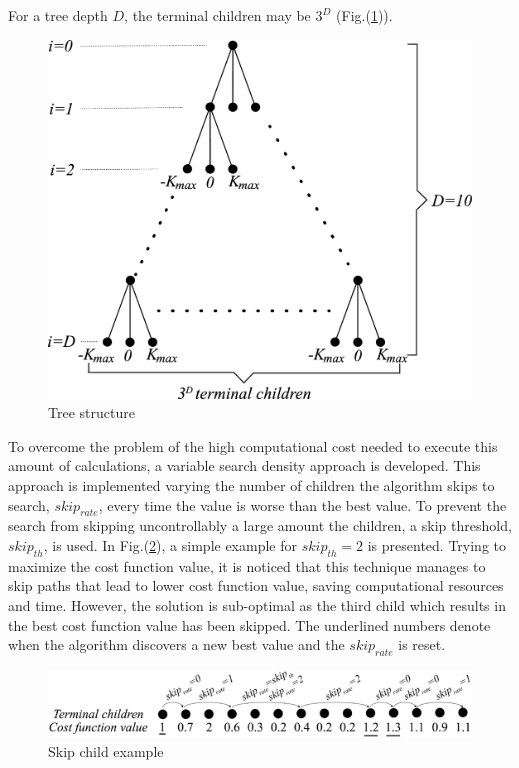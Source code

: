 \documentclass[journal]{new-aiaa}
\begin{document}
For a tree depth $D$, the terminal children may be $3^D$ (Fig.(\ref{fig:tree2})). 
\begin{figure}[H]
\centering
\includegraphics[width=5in]{tree2test.eps}
\caption{Tree structure}
\label{fig:tree2}
\end{figure}

To overcome the problem of the high computational cost needed to execute this amount of calculations, a variable search density approach is developed. This approach is implemented varying the number of children the algorithm skips to search, ${skip}_{rate}$, every time the value is worse than the best value. To prevent the search from skipping uncontrollably a large amount the children, a skip threshold, ${skip}_{th}$, is used. In Fig.(\ref{fig:skipexample}), a simple example for ${skip}_{th}=2$ is presented. Trying to maximize the cost function value, it is noticed that this technique manages to skip paths that lead to lower cost function value, saving computational resources and time. However, the solution is sub-optimal as the third child which results in the best cost function value has been skipped. The underlined numbers denote when the algorithm discovers a new best value and the $skip_{rate}$ is reset.

\begin{figure}[H]
\centering
\includegraphics[width=1\textwidth]{skipexampletest.eps}
\caption{Skip child example}
\label{fig:skipexample}
\end{figure}
\end{document}
